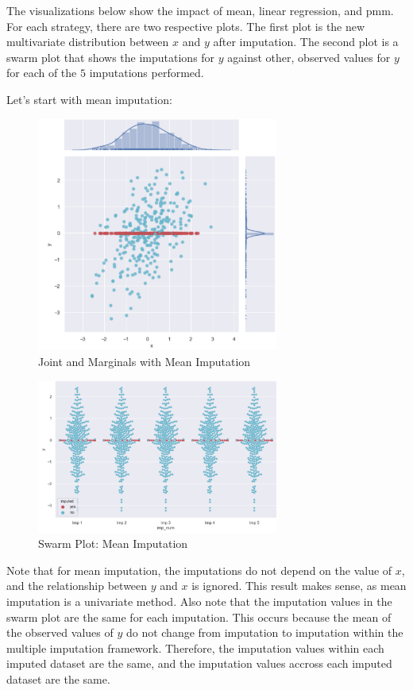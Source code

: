 \documentclass[12pt,oneside]{chicagocapstone}
\begin{document}
The visualizations below show the impact of mean, linear regression, and
pmm. For each strategy, there are two respective plots. The first plot
is the new multivariate distribution between \(x\) and \(y\) after
imputation. The second plot is a swarm plot that shows the imputations
for \(y\) against other, observed values for \(y\) for each of the \(5\)
imputations performed.

Let's start with mean imputation:
\begin{figure}

{\centering \includegraphics[width=300px]{figure/multi-mean} 

}

\caption{Joint and Marginals with Mean Imputation}\label{fig:multi-mean}
\end{figure}
\begin{figure}

{\centering \includegraphics[width=300px]{figure/swarm-mean} 

}

\caption{Swarm Plot: Mean Imputation}\label{fig:swarm-mean}
\end{figure}
Note that for mean imputation, the imputations do not depend on the
value of \(x\), and the relationship between \(y\) and \(x\) is ignored.
This result makes sense, as mean imputation is a univariate method. Also
note that the imputation values in the swarm plot are the same for each
imputation. This occurs because the mean of the observed values of \(y\)
do not change from imputation to imputation within the multiple
imputation framework. Therefore, the imputation values within each
imputed dataset are the same, and the imputation values accross each
imputed dataset are the same.
\end{document}
